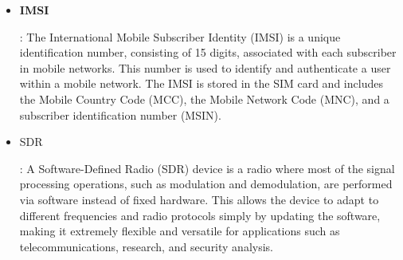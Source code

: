 \documentclass[english]{article}
\begin{document}
\begin{itemize}
	\item \hypertarget{IMSI}{\textbf{IMSI}}:
	      The International Mobile Subscriber Identity (IMSI) is a unique identification number,
	      consisting of 15 digits, associated with each subscriber in mobile networks.
	      This number is used to identify and authenticate a user within a mobile network.
	      The IMSI is stored in the SIM card and includes the Mobile Country Code (MCC),
	      the Mobile Network Code (MNC), and a subscriber identification number (MSIN).

	\item \hypertarget{SDR}{SDR}:
	      A Software-Defined Radio (SDR) device is a radio where most of the signal processing operations,
	      such as modulation and demodulation, are performed via software instead of fixed hardware.
	      This allows the device to adapt to different frequencies and radio protocols simply by
	      updating the software, making it extremely flexible and versatile for applications such
	      as telecommunications, research, and security analysis.


\end{itemize}
\end{document}
